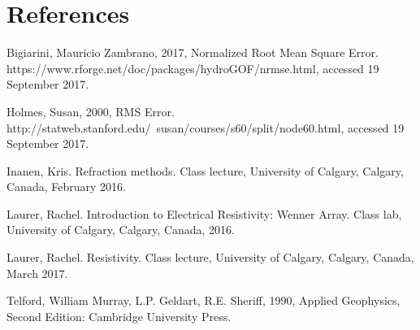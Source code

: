 \documentclass[12p]{article}
\newenvironment{hangingpar}[1]
  {\begin{list}
          {}
          {\setlength{\itemindent}{-#1}%
           \setlength{\leftmargin}{#1}%
           \setlength{\itemsep}{0pt}%
           \setlength{\parsep}{\parskip}%
           \setlength{\topsep}{\parskip}%
           }
    \setlength{\parindent}{-#1}%
    \item[]
  }
  {\end{list}}
\theoremstyle{definition}
\begin{document}
\section{References}
\begin{hangingpar}{2em}
  Bigiarini, Mauricio Zambrano, 2017, Normalized Root Mean Square Error.\\
  https://www.rforge.net/doc/packages/hydroGOF/nrmse.html, accessed 19 September 2017.

  Holmes, Susan, 2000, RMS Error.\\
  http://statweb.stanford.edu/~susan/courses/s60/split/node60.html, accessed 19 September 2017.

  Inanen, Kris. Refraction methods. Class lecture, University of Calgary, Calgary, Canada, February 2016.

  Laurer, Rachel. Introduction to Electrical Resistivity: Wenner Array. Class lab, University of Calgary, Calgary, Canada, 2016.

  Laurer, Rachel. Resistivity. Class lecture, University of Calgary, Calgary, Canada, March 2017.

  Telford, William Murray, L.P. Geldart, R.E. Sheriff, 1990, Applied Geophysics, Second Edition: Cambridge University Press.
\end{hangingpar}
\end{document}
